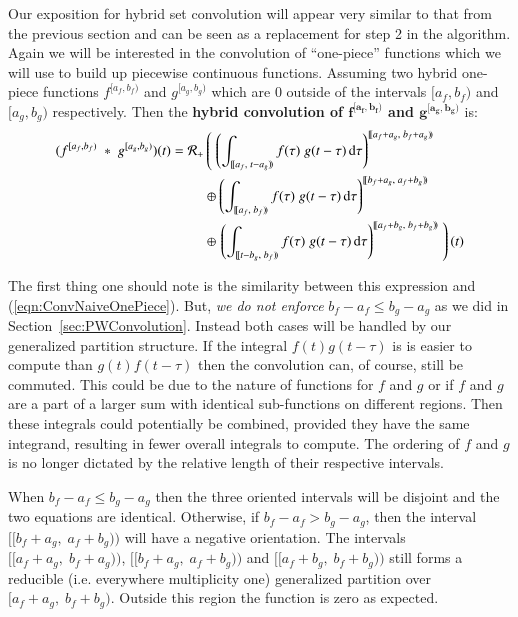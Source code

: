 Our exposition for hybrid set convolution will appear very similar to that from the previous section and can be seen as a
 replacement for step 2 in the algorithm.
Again we will be interested in the convolution of ``one-piece'' functions which we will use to build up piecewise
continuous functions.
Assuming two hybrid one-piece functions $f^{[a_f, b_f)}$ and $g^{[a_g,b_g)}$ which are 0 outside of the intervals
 $[a_f,b_f)$ and $[a_g, b_g)$ respectively.
Then the \textbf{hybrid convolution of $\boldsymbol{f^{[a_f,b_f)}}$ and $\boldsymbol{g^{[a_g,b_g)}}$} is:
	\begin{align}
		\label{eqn:defHConvolution}
		(f^{[a_f,b_f)} \;*\; g^{[a_g,b_g)}) (t) = 
			\R[+] &\left( \; 
				\left( 
					\int_{[\![a_f,\;t-a_g)\!)} f(\tau) \; g(t-\tau) \diff\tau 
				\right)^{[\![a_f+a_g,\; b_f+a_g)\!)} 
			\right. \notag \\ 
			&\oplus 
				\left( 
					\int_{[\![a_f,\;b_f)\!)} f(\tau) \; g(t-\tau) \diff\tau 
				\right)^{[\![b_f+a_g,\; a_f+b_g)\!)} 
			\notag \\ 
			&\oplus \left. 
				\left( 
					\int_{[\![t-b_g,\;b_f)\!)} f(\tau) \; g(t-\tau) \diff\tau 
				\right)^{[\![a_f+b_g,\; b_f+b_g)\!)} 
			\; \right)(t)
	\end{align}

The first thing one should note is the similarity between this expression and (\ref{eqn:ConvNaiveOnePiece}).
But, \emph{we do not enforce} $b_f - a_f \leq b_g - a_g$ as we did in Section~\ref{sec:PWConvolution}.
Instead both cases will be handled by our generalized partition structure.
If the integral $f(t)g(t-\tau)$ is is easier to compute than $g(t)f(t-\tau)$ then the convolution can, of course, 
still be commuted.
This could be due to the nature of functions for $f$ and $g$ or if $f$ and $g$ are a part of a larger sum with identical 
sub-functions on different regions.
Then these integrals could potentially be combined, provided they have the same integrand, resulting in fewer overall 
integrals to compute.
The ordering of $f$ and $g$ is no longer dictated by the relative length of their respective intervals.


When $b_f - a_f \leq b_g - a_g$ then the three oriented intervals will be disjoint and the two equations are identical.
Otherwise, if $b_f - a_f > b_g - a_g$, then the interval $[\![b_f +a_g, \; a_f + b_g)\!)$ will have a negative orientation.
The intervals $[\![a_f+a_g, \; b_f+a_g)\!)$, $[\![b_f+a_g, \; a_f+b_g)\!)$ and $[\![a_f+b_g, \; b_f+b_g)\!)$ still forms
a reducible (i.e. everywhere multiplicity one) generalized partition over $[a_f+a_g, \; b_f+b_g)$.
Outside this region the function is zero as expected. 


